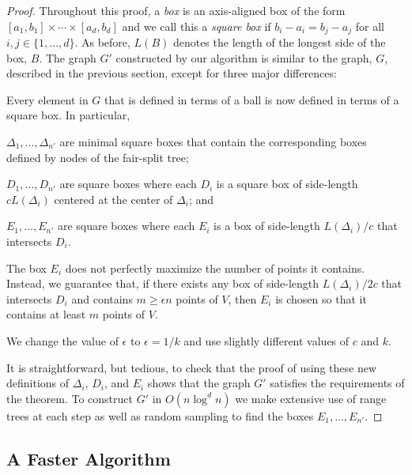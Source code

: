 \documentclass{patmorin}
\begin{document}
\begin{proof}
  Throughout this proof, a \emph{box} is an axis-aligned box of the form
  $[a_1,b_1]\times\cdots\times[a_d,b_d]$ and we call this a \emph{square
  box} if $b_i-a_i=b_j-a_j$ for all $i,j\in\{1,\ldots,d\}$. As before,
  $L(B)$ denotes the length of the longest side of the box, $B$.  The
  graph $G'$ constructed by our algorithm is similar to the graph, $G$,
  described in the previous section, except for three major differences:
  \begin{compactenum}
     \item Every element in $G$ that is defined in terms of a ball is
     now defined in terms of a square box.  In particular,
     \begin{compactenum}
       \item $\Delta_1,\ldots,\Delta_{n'}$ are minimal square boxes that contain
         the corresponding boxes defined by nodes of the fair-split tree;
       \item $D_1,\ldots,D_{n'}$ are square boxes where each $D_i$
         is a square box of side-length $cL(\Delta_i)$ centered at the
         center of $\Delta_i$; and
       \item $E_1,\ldots,E_{n'}$ are square boxes where each $E_i$ is a box of
         side-length $L(\Delta_i)/c$ that intersects $D_i$.
     \end{compactenum}
     \item The box $E_i$ does not perfectly maximize the number of points
       it contains. Instead, we guarantee that, if there exists any
       box of side-length $L(\Delta_i)/2c$ that intersects $D_i$ and
       contains $m\ge \epsilon n$ points of $V$, then $E_i$ is chosen so that
       it contains at least $m$ points of $V$.
     \item We change the value of $\epsilon$ to $\epsilon = 1/k$
      and use slightly different values of $c$ and $k$.
  \end{compactenum} 
  It is straightforward, but tedious, to check that the proof of
   using these new definitions of $\Delta_i$, $D_i$,
  and $E_i$ shows that the graph $G'$ satisfies the requirements of the
  theorem.  To construct $G'$ in $O(n\log^d n)$ we make extensive use
  of range trees \cite{bentley:multidimensional,luecker:data} at each
  step as well as random sampling to find the boxes $E_1,\ldots,E_{n'}$.
\end{proof}

\subsection{A Faster Algorithm}
\end{document}

